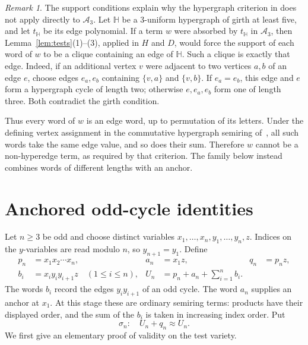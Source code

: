 \documentclass[11pt,reqno]{amsart}
\numberwithin{equation}{section}
\theoremstyle{definition}
\theoremstyle{remark}
\newtheorem{remark}[theorem]{Remark}
\newcommand{\Athree}{\mathcal A_3}
\newcommand{\eqid}{\approx}
\begin{document}
\begin{remark}\label{rem:hypergraphs}
The support conditions explain why the hypergraph criterion in
\cite[Theorem~2.2]{GJRZ2025} does not apply directly to $\Athree$.
Let $\mathbb H$ be a $3$-uniform hypergraph of girth at least five,
and let $t_{\mathbb H}$ be its edge polynomial. If a term $w$ were
absorbed by $t_{\mathbb H}$ in $\Athree$, then Lemma~\ref{lem:tests}(1)--(3),
applied in $H$ and $D$, would force the support of each word of $w$
to be a clique containing an edge of $\mathbb H$.
Such a clique is exactly that edge. Indeed, if an additional
vertex $v$ were adjacent to two vertices $a,b$ of an edge $e$,
choose edges $e_a,e_b$ containing $\{v,a\}$ and $\{v,b\}$.
If $e_a=e_b$, this edge and $e$ form a hypergraph cycle of length
two; otherwise $e,e_a,e_b$ form one of length three.
Both contradict the girth condition.

Thus every word of $w$ is an edge word, up to permutation of its
letters. Under the defining vertex assignment in the commutative
hypergraph semiring of~\cite{GJRZ2025}, all such words take the
same edge value, and so does their sum. Therefore $w$ cannot be
a non-hyperedge term, as required by that criterion.
The family below instead combines words of different lengths
with an anchor.
\end{remark}

\section{Anchored odd-cycle identities}
\label{sec:cycles}

Let $n\geq3$ be odd and choose distinct variables
$x_1,\ldots,x_n,y_1,\ldots,y_n,z$. Indices on the $y$-variables are
read modulo $n$, so $y_{n+1}=y_1$. Define
\begin{equation}\label{eq:cycle}
\begin{aligned}
p_n&=x_1x_2\cdots x_n,&
a_n&=x_1z,&
q_n&=p_nz,\\
b_i&=x_i y_i y_{i+1}z\quad(1\leq i\leq n),&
U_n&=p_n+a_n+\sum_{i=1}^{n}b_i.
\end{aligned}
\end{equation}
The words $b_i$ record the edges $y_i y_{i+1}$ of an odd cycle.
The word $a_n$ supplies an anchor at $x_1$. At this stage these are
ordinary semiring terms: products have their displayed order, and
the sum of the $b_i$ is taken in increasing index order. Put
\[
\sigma_n:\quad U_n+q_n\eqid U_n.
\]
We first give an elementary proof of validity on the test variety.
\end{document}
